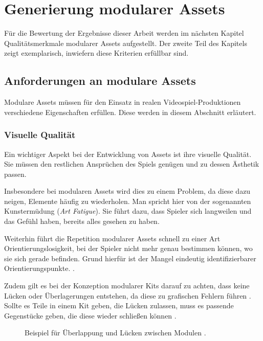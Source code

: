 \chapter{Generierung modularer Assets}
Für die Bewertung der Ergebnisse dieser Arbeit werden im nächsten Kapitel Qualitätsmerkmale modularer Assets aufgestellt. Der zweite Teil des Kapitels zeigt exemplarisch, inwiefern diese Kriterien erfüllbar sind.
\section{Anforderungen an modulare Assets}
Modulare Assets müssen für den Einsatz in realen Videospiel-Produktionen verschiedene Eigenschaften erfüllen. Diese werden in diesem Abschnitt erläutert.
\subsection{Visuelle Qualität}\label{vqualitaet}
Ein wichtiger Aspekt bei der Entwicklung von Assets ist ihre visuelle Qualität. Sie müssen den restlichen Ansprüchen des Spiels genügen und zu dessen Ästhetik passen.
\par
Insbesondere bei modularen Assets wird dies zu einem Problem, da diese dazu neigen, Elemente häufig zu wiederholen. Man spricht hier von der sogenannten Kunstermüdung (\textit{Art Fatigue}). Sie führt dazu, dass Spieler sich langweilen und das Gefühl haben, bereits alles gesehen zu haben. \parencite{Burgess}
\par
Weiterhin führt die Repetition modularer Assets schnell zu einer Art Orientierungslosigkeit, bei der Spieler nicht mehr genau bestimmen können, wo sie sich gerade befinden. Grund hierfür ist der Mangel eindeutig identifizierbarer Orientierungspunkte. \parencite{unrealModular}.
\par
Zudem gilt es bei der Konzeption modularer Kits darauf zu achten, dass keine Lücken oder Überlagerungen entstehen, da diese zu grafischen Fehlern führen \parencite{Mader}. Sollte es Teile in einem Kit geben, die Lücken zulassen, muss es passende Gegenstücke geben, die diese wieder schließen können \parencite{Burgess}.
 \begin{figure}[!h]
\centering
  \caption{Beispiel für Überlappung und Lücken zwischen Modulen \parencite{Mader}.}
	\label{glitch}
\end{figure}

